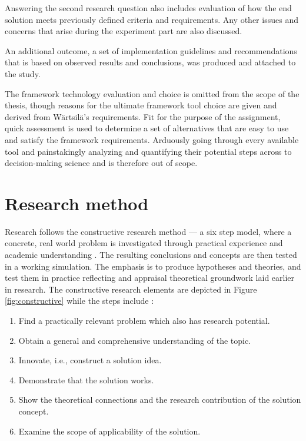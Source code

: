 \documentclass[12pt,a4paper,oneside,pdftex]{report}
\begin{document}
Answering the second research question also includes evaluation of how the end solution meets previously defined criteria and requirements. Any other issues and concerns that arise during the experiment part are also discussed.

An additional outcome, a set of implementation guidelines and recommendations that is based on observed results and conclusions, was produced and attached to the study. %

The framework technology evaluation and choice is omitted from the scope of the thesis, though reasons for the ultimate framework tool choice are given and derived from Wärtsilä's requirements. Fit for the purpose of the assignment, quick assessment is used to determine a set of alternatives that are easy to use and satisfy the framework requirements. Arduously going through every available tool and painstakingly analyzing and quantifying their potential steps across to decision-making science and is therefore out of scope. 


\section{Research method}
Research follows the constructive research method --- a six step model, where a concrete, real world problem is investigated through practical experience and academic understanding \citep{kasanen1993constructive}. The resulting conclusions and concepts are then tested in a working simulation. The emphasis is to produce hypotheses and theories, and test them in practice reflecting and appraisal theoretical groundwork laid earlier in research. The constructive research elements are depicted in Figure \ref{fig:constructive} while the steps include \citet{kasanen1993constructive}:
\\
\begin{adjustwidth}{2.5em}{0pt}
\small
\begin{enumerate}[itemsep=0mm]
\item Find a practically relevant problem which also has research potential.
\item Obtain a general and comprehensive understanding of the topic.
\item Innovate, i.e., construct a solution idea.
\item Demonstrate that the solution works.
\item Show the theoretical connections and the research contribution of the solution concept.
\item Examine the scope of applicability of the solution.
\end{enumerate}
\normal
\end{adjustwidth}
\end{document}
